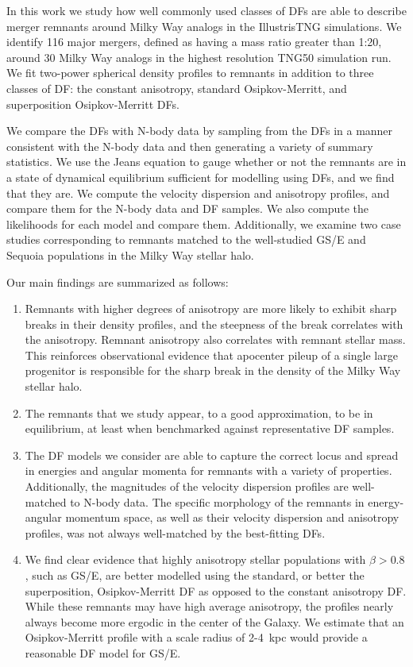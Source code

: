 In this work we study how well commonly used classes of DFs are able to describe merger remnants around Milky Way analogs in the IllustrisTNG simulations. We identify 116 major mergers, defined as having a mass ratio greater than 1:20, around 30 Milky Way analogs in the highest resolution TNG50 simulation run. We fit two-power spherical density profiles to remnants in addition to three classes of DF: the constant anisotropy, standard Osipkov-Merritt, and superposition Osipkov-Merritt DFs.

We compare the DFs with N-body data by sampling from the DFs in a manner consistent with the N-body data and then generating a variety of summary statistics. We use the Jeans equation to gauge whether or not the remnants are in a state of dynamical equilibrium sufficient for modelling using DFs, and we find that they are. We compute the velocity dispersion and anisotropy profiles, and compare them for the N-body data and DF samples. We also compute the likelihoods for each model and compare them. Additionally, we examine two case studies corresponding to remnants matched to the well-studied GS/E and Sequoia populations in the Milky Way stellar halo.

Our main findings are summarized as follows:

\begin{enumerate}
    \item Remnants with higher degrees of anisotropy are more likely to exhibit sharp breaks in their density profiles, and the steepness of the break correlates with the anisotropy. Remnant anisotropy also correlates with remnant stellar mass. This reinforces observational evidence that apocenter pileup of a single large progenitor is responsible for the sharp break in the density of the Milky Way stellar halo.
    \item The remnants that we study appear, to a good approximation, to be in equilibrium, at least when benchmarked against representative DF samples.
    \item The DF models we consider are able to capture the correct locus and spread in energies and angular momenta for remnants with a variety of properties. Additionally, the magnitudes of the velocity dispersion profiles are well-matched to N-body data. The specific morphology of the remnants in energy-angular momentum space, as well as their velocity dispersion and anisotropy profiles, was not always well-matched by the best-fitting DFs.
    \item We find clear evidence that highly anisotropy stellar populations with $\beta > 0.8$, such as GS/E, are better modelled using the standard, or better the superposition, Osipkov-Merritt DF as opposed to the constant anisotropy DF. While these remnants may have high average anisotropy, the profiles nearly always become more ergodic in the center of the Galaxy. We estimate that an Osipkov-Merritt profile with a scale radius of 2-4~kpc would provide a reasonable DF model for GS/E.
\end{enumerate}

